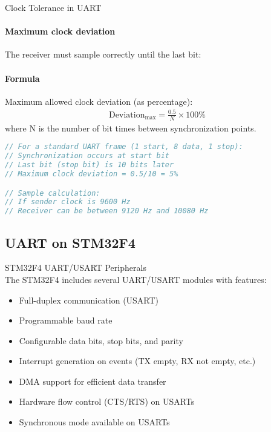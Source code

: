 \begin{KR}{Clock Tolerance in UART}
\paragraph{Maximum clock deviation}
The receiver must sample correctly until the last bit:
\paragraph{Formula}
Maximum allowed clock deviation (as percentage):
\begin{align}
\text{Deviation}_{\max} = \frac{0.5}{N} \times 100\%
\end{align}
where N is the number of bit times between synchronization points.

\begin{lstlisting}[language=C, style=basesmol]
// For a standard UART frame (1 start, 8 data, 1 stop):
// Synchronization occurs at start bit
// Last bit (stop bit) is 10 bits later
// Maximum clock deviation = 0.5/10 = 5%

// Sample calculation:
// If sender clock is 9600 Hz
// Receiver can be between 9120 Hz and 10080 Hz
\end{lstlisting}
\end{KR}

\subsection{UART on STM32F4}

\begin{concept}{STM32F4 UART/USART Peripherals}\\
The STM32F4 includes several UART/USART modules with features:
\begin{itemize}
    \item Full-duplex communication (USART)
    \item Programmable baud rate
    \item Configurable data bits, stop bits, and parity
    \item Interrupt generation on events (TX empty, RX not empty, etc.)
    \item DMA support for efficient data transfer
    \item Hardware flow control (CTS/RTS) on USARTs
    \item Synchronous mode available on USARTs
\end{itemize}
\end{concept}

